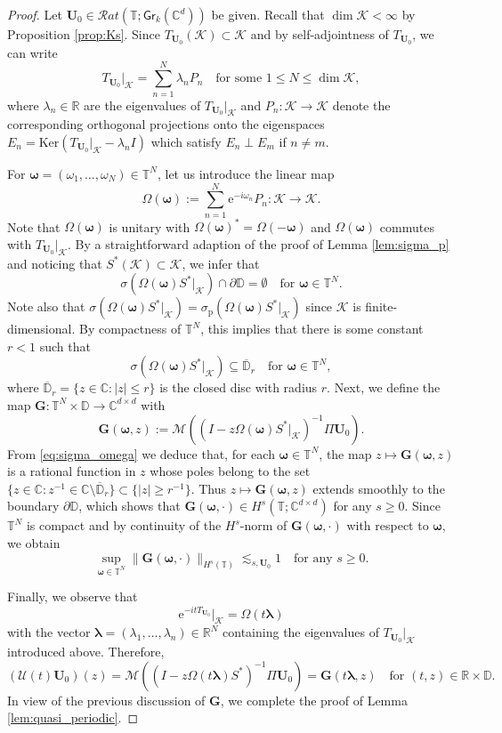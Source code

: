 \documentclass[10pt,reqno,a4paper]{amsart}
\theoremstyle{definition}
\theoremstyle{remark}
\theoremstyle{remark}
\numberwithin{equation}{section}
\newcommand{\C}{\mathbb{C}}
\newcommand{\R}{\mathbb{R}}
\newcommand{\T}{\mathbb{T}}
\newcommand{\D}{\mathbb{D}}
\newcommand{\Mean}{\mathscr{M}}
\newcommand{\ov}{\overline}
\renewcommand{\ker}{\mathrm{Ker}}
\newcommand{\pt}{\partial}
\renewcommand{\sp}{\sigma_{\mathrm{p}}}
\newcommand{\be}{\begin{equation}}
\newcommand{\ee}{\end{equation}}
\newcommand{\eu}{\mathrm{e}}
\newcommand{\Ub}{\mathbf{U}}
\newcommand{\Gb}{\mathbf{G}}
\newcommand{\id}{I}
\newcommand{\Gr}{\mathsf{Gr}}
\newcommand{\Om}{\Omega}
\newcommand{\Ks}{\mathscr{K}}
\newcommand{\Us}{\mathscr{U}}
\begin{document}
\begin{proof}
Let $\Ub_0 \in \mathcal{R}at(\T; \Gr_k(\C^d))$ be given. Recall that $\dim \Ks < \infty$  by Proposition \ref{prop:Ks}. Since $T_{\Ub_0}(\Ks) \subset \Ks$ and by self-adjointness of $T_{\Ub_0}$, we can write
$$
T_{\Ub_0} |_\Ks = \sum_{n=1}^N \lambda_n P_n  \quad \mbox{for some $1 \leq N \leq \dim \Ks$},
$$
where $\lambda_n \in \R$ are the eigenvalues of $T_{\Ub_0} |_\Ks$ and $P_n : \Ks \to \Ks$ denote the corresponding orthogonal projections onto the eigenspaces $E_n = \ker(T_{\Ub_0}|_\Ks - \lambda_n \id )$ which satisfy $E_n \perp E_m$ if $n \neq m$.

For $\bm{\omega}=(\omega_1, \ldots, \omega_N) \in \T^N$, let us introduce the linear map 
$$
 \Om(\bm{\omega}) := \sum_{n=1}^N \eu^{-i \omega_n} P_n : \Ks \to \Ks.
$$
Note that $\Om(\bm{\omega})$ is unitary with $\Om(\bm{\omega})^* = \Om(-\bm{\omega})$ and $\Omega(\bm{\omega})$ commutes with $T_{\Ub_0}|_{\Ks}$. By a straightforward adaption of the proof of Lemma \ref{lem:sigma_p} and noticing that $S^*(\Ks) \subset \Ks$, we infer that
$$
\sigma( \Om(\bm{\omega}) S^* |_{\Ks}) \cap \pt \D = \emptyset \quad \mbox{for $\bm{\omega} \in \T^N$}.
$$
Note also that $\sigma( \Om(\bm{\omega}) S^* |_{\Ks})=\sp( \Om(\bm{\omega}) S^* |_{\Ks})$ since $\Ks$ is finite-dimensional. By compactness of $\T^N$, this implies that there is some constant $r < 1$ such that
\be \label{eq:sigma_omega}
\sigma(\Om(\bm{\omega}) S^* |_{\Ks} ) \subseteq \ov{\D}_r \quad \mbox{for $\bm{\omega} \in \T^N$},
\ee
where $\ov{\D}_r = \{ z \in \C : |z| \leq r \}$ is the closed disc with radius $r$. Next, we define the map $\Gb : \T^N \times \D \to \C^{d \times d}$ with
$$
\Gb(\bm{\omega}, z) := \Mean \left ( ( \id - z \Om(\bm{\omega}) S^* |_{\Ks})^{-1} \Pi \Ub_0 \right ).
$$
From \eqref{eq:sigma_omega} we deduce that, for each $\bm{\omega} \in \T^N$, the map $z \mapsto \Gb(\bm{\omega}, z)$ is a rational function in $z$ whose poles belong to the set $\{ z \in \C : z^{-1} \in \C \setminus \ov{\D}_r \} \subset \{ |z| \geq r^{-1} \}$. Thus $z \mapsto \Gb(\bm{\omega}, z)$ extends smoothly to the boundary $\pt \D$, which shows that $\Gb(\bm{\omega}, \cdot) \in H^s(\T; \C^{d \times d})$ for any $s \geq 0$. Since $\T^N$ is compact and by continuity of the $H^s$-norm of $\Gb(\bm{\omega}, \cdot)$ with respect to $\bm{\omega}$, we obtain
\be \label{ineq:apriori_quasi}
\sup_{\bm{\omega} \in \T^N} \| \Gb(\bm{\omega}, \cdot) \|_{H^s(\T)} \lesssim_{s,\Ub_0} 1 \quad \mbox{for any $s \geq 0$}.
\ee

Finally, we observe that 
$$
\eu^{-it T_{\Ub_0}} |_\Ks = \Omega(t \bm{\lambda})
$$
with the vector $\bm{\lambda}=(\lambda_1, \ldots, \lambda_n) \in \R^N$ containing the eigenvalues of $T_{\Ub_0} |_\Ks$ introduced above. Therefore,
$$
(\Us(t)\Ub_0)(z) = \Mean \left ( (\id-z \Omega(t \bm{\lambda}) S^*)^{-1} \Pi \Ub_0 \right ) = \Gb(t \bm{\lambda}, z) \quad \mbox{for $(t,z) \in \R \times \D$}.
$$
In view of the previous discussion of $\Gb$, we complete the proof of Lemma \ref{lem:quasi_periodic}.
\end{proof}
\end{document}
